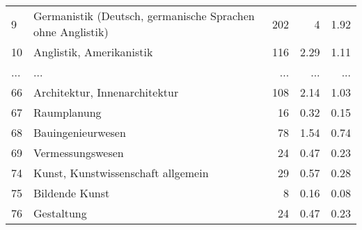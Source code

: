 \begin{longtable}{lXrrr}
        9 & \multicolumn{1}{X}{Germanistik (Deutsch, germanische Sprachen ohne Anglistik)} & %
          \num{202} &
          \num[round-mode=places,round-precision=2]{4} &
          \num[round-mode=places,round-precision=2]{1,92} \\
        10 & \multicolumn{1}{X}{Anglistik, Amerikanistik} & %
          \num{116} &
          \num[round-mode=places,round-precision=2]{2,29} &
          \num[round-mode=places,round-precision=2]{1,11} \\
       ... & ... & ... & ... & ... \\
        66 & \multicolumn{1}{X}{Architektur, Innenarchitektur} & %
          \num{108} &
          \num[round-mode=places,round-precision=2]{2,14} &
          \num[round-mode=places,round-precision=2]{1,03} \\

        67 & \multicolumn{1}{X}{Raumplanung} & %
          \num{16} &
          \num[round-mode=places,round-precision=2]{0,32} &
          \num[round-mode=places,round-precision=2]{0,15} \\

        68 & \multicolumn{1}{X}{Bauingenieurwesen} & %
          \num{78} &
          \num[round-mode=places,round-precision=2]{1,54} &
          \num[round-mode=places,round-precision=2]{0,74} \\

        69 & \multicolumn{1}{X}{Vermessungswesen} & %
          \num{24} &
          \num[round-mode=places,round-precision=2]{0,47} &
          \num[round-mode=places,round-precision=2]{0,23} \\

        74 & \multicolumn{1}{X}{Kunst, Kunstwissenschaft allgemein} & %
          \num{29} &
          \num[round-mode=places,round-precision=2]{0,57} &
          \num[round-mode=places,round-precision=2]{0,28} \\

        75 & \multicolumn{1}{X}{Bildende Kunst} & %
          \num{8} &
          \num[round-mode=places,round-precision=2]{0,16} &
          \num[round-mode=places,round-precision=2]{0,08} \\

        76 & \multicolumn{1}{X}{Gestaltung} & %
          \num{24} &
          \num[round-mode=places,round-precision=2]{0,47} &
          \num[round-mode=places,round-precision=2]{0,23} \\


\end{longtable}
